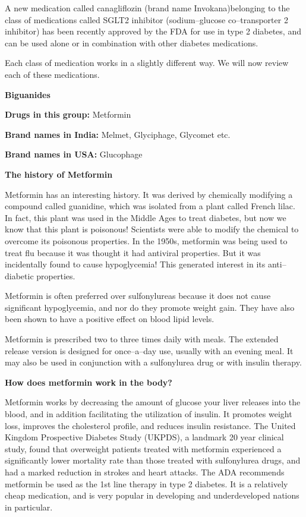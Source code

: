 A new medication called canagliflozin (brand name Invokana)\break belonging to the class of medications called SGLT2 inhibitor (sodium–glucose co–transporter 2 inhibitor) has been recently approved by the FDA for use in type 2 diabetes, and can be used alone or in combination with other diabetes medications.

Each class of medication works in a slightly different way. We will now review each of these medications.

\vskip 6pt

\textbf{Biguanides}

\textbf{Drugs in this group:} Metformin

\textbf{Brand names in India:} Melmet, Glyciphage, Glycomet etc.

\textbf{Brand names in USA:} Glucophage

\noindent\textbf{The history of Metformin}

Metformin has an interesting history. It was derived by chemi\-cally modifying a compound called guanidine, which was isolated from a plant called French lilac. In fact, this plant was used in the Middle Ages to treat diabetes, but now we know that this plant is poiso\-nous! Scie\-ntists were able to modify the chemical to overcome its poisonous properties. In the 1950s, metformin was being used to treat flu because it was thought it had antiviral properties. But it was inci\-de\-ntally found to cause hypoglycemia! This generated interest in its anti–diabetic properties.

Metformin is often preferred over sulfonylureas because it does not cause significant hypoglycemia, and nor do they promote weight gain. They have also been shown to have a positive effect on blood lipid levels.

Metformin is prescribed two to three times daily with meals. The extended release version is designed for once–a–day use, usually with an evening meal. It may also be used in conjunction with a sulfonylurea drug or with insulin therapy.

\noindent\textbf{How does metformin work in the body?}

Metformin works by decreasing the amount of glucose your liver releases into the blood, and in addition facilitating the utilization of insulin. It promotes weight loss, improves the cholesterol profile, and reduces insulin resistance. The United Kingdom Prospective Diabetes Study (UKPDS), a landmark 20 year clinical study, found that overweight patients treated with metformin experienced a significantly lower mortality rate than those treated with sulfonylurea drugs, and had a marked reduction in strokes and heart attacks. The ADA reco\-mmends metformin be used as the 1st line therapy in type 2 diabetes. It is a relatively cheap medication, and is very popular in developing and underdeveloped nations in particular.

